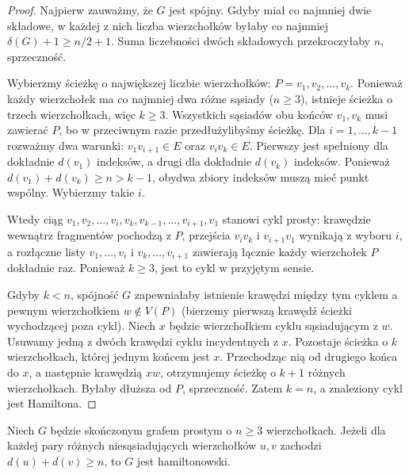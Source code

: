 \begin{proof}
Najpierw zauważmy, że $G$ jest spójny.
Gdyby miał co najmniej dwie składowe, w każdej
z nich liczba wierzchołków byłaby co najmniej
$\delta(G)+1\ge n/2+1$. Suma liczebności dwóch
składowych przekroczyłaby $n$, sprzeczność.

Wybierzmy ścieżkę o największej liczbie wierzchołków:
$P=v_1,v_2,\ldots,v_k$. Ponieważ każdy wierzchołek
ma co najmniej dwa różne sąsiady ($n\ge3$),
istnieje ścieżka o trzech wierzchołkach, więc $k\ge3$. Wszystkich sąsiadów obu
końców $v_1,v_k$ musi zawierać $P$, bo w przeciwnym
razie przedłużylibyśmy ścieżkę.
Dla $i=1,\ldots,k-1$ rozważmy dwa warunki:
$v_1v_{i+1}\in E$ oraz $v_iv_k\in E$.
Pierwszy jest spełniony dla dokładnie $d(v_1)$ indeksów,
a drugi dla dokładnie $d(v_k)$ indeksów.
Ponieważ $d(v_1)+d(v_k)\ge n>k-1$, obydwa
zbiory indeksów muszą mieć punkt wspólny.
Wybierzmy takie $i$.

Wtedy ciąg
$v_1,v_2,\ldots,v_i,v_k,v_{k-1},\ldots,v_{i+1},v_1$
stanowi cykl prosty: krawędzie wewnątrz fragmentów
pochodzą z $P$, przejścia $v_i v_k$ i $v_{i+1}v_1$
wynikają z wyboru $i$, a rozłączne listy
$v_1,\ldots,v_i$ i $v_k,\ldots,v_{i+1}$ zawierają
łącznie każdy wierzchołek $P$ dokładnie raz.
Ponieważ $k\ge3$, jest to cykl w przyjętym sensie.

Gdyby $k<n$, spójność $G$ zapewniałaby istnienie
krawędzi między tym cyklem a pewnym wierzchołkiem
$w\notin V(P)$ (bierzemy pierwszą krawędź ścieżki
wychodzącej poza cykl). Niech $x$ będzie wierzchołkiem cyklu sąsiadującym z $w$.
Usuwamy jedną z dwóch krawędzi cyklu incydentnych z $x$.
Pozostaje ścieżka o $k$ wierzchołkach, której jednym
końcem jest $x$. Przechodząc nią od drugiego końca do
$x$, a następnie krawędzią $xw$, otrzymujemy ścieżkę
o $k+1$ różnych wierzchołkach.
Byłaby dłuższa od $P$, sprzeczność.
Zatem $k=n$, a znaleziony cykl jest Hamiltona.
\end{proof}

\begin{twierdzenie}[Ore]
\label{thm:tg-ore}
Niech $G$ będzie skończonym grafem prostym o
$n\ge3$ wierzchołkach. Jeżeli dla każdej pary
różnych niesąsiadujących wierzchołków $u,v$
zachodzi $d(u)+d(v)\ge n$, to $G$ jest hamiltonowski.
\end{twierdzenie}

